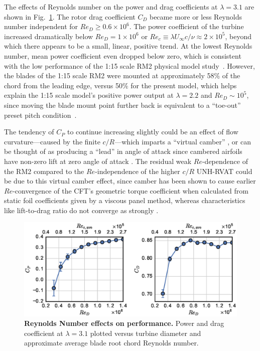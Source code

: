 \documentclass[10pt,letterpaper]{article}
\begin{document}
The effects of Reynolds number on the power and drag coefficients at
$\lambda=3.1$ are shown in Fig.~\ref{fig:perf-re-dep}. The rotor drag
coefficient $C_D$ became more or less Reynolds number independent for $Re_D \ge
0.6 \times 10^6$. The power coefficient of the turbine increased dramatically
below $Re_D = 1 \times 10^6$ or $Re_c \equiv \lambda U_\infty c / \nu \approx 2
\times 10^5$, beyond which there appears to be a small, linear, positive trend.
At the lowest Reynolds number, mean power coefficient even dropped below zero,
which is consistent with the low performance of the 1:15 scale RM2 physical
model study~\cite{Hill2014}. However, the blades of the 1:15 scale RM2 were
mounted at approximately 58\% of the chord from the leading edge, versus 50\%
for the present model, which helps explain the 1:15 scale model's positive power
output at $\lambda=2.2$ and $Re_D \sim 10^5$, since moving the blade mount point
further back is equivalent to a ``toe-out'' preset pitch
condition~\cite{Fiedler2009}.

The tendency of $C_P$ to continue increasing slightly could be an effect of flow
curvature---caused by the finite $c/R$---which imparts a ``virtual camber''
\cite{Migliore1980}, or can be thought of as producing a ``lead'' in angle of
attack since cambered airfoils have non-zero lift at zero angle of attack
\cite{Goude2012}. The residual weak $Re$-dependence of the RM2 compared to the
$Re$-independence of the higher $c/R$ UNH-RVAT could be due to this virtual
camber effect, since camber has been shown to cause earlier $Re$-convergence of
the CFT's geometric torque coefficient when calculated from static foil
coefficients given by a viscous panel method, whereas characteristics like
lift-to-drag ratio do not converge as strongly \cite{Bachant2016-RVAT-Re-dep}.

\begin{figure}
    \includegraphics[width=\textwidth]{figures/perf_re_dep.eps}

    \caption{{\bf Reynolds Number effects on performance.} Power and drag
    coefficient at $\lambda=3.1$ plotted versus turbine diameter and approximate
    average blade root chord Reynolds number.}

    \label{fig:perf-re-dep}
\end{figure}
\end{document}

